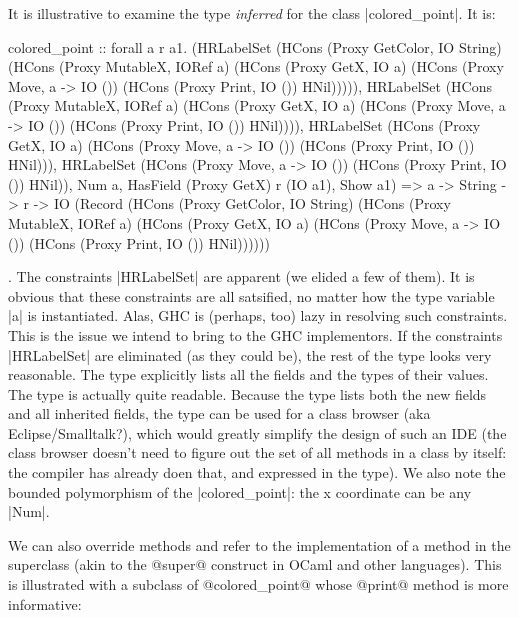 \noindent
It is illustrative to examine the type \emph{inferred} for the class 
|colored_point|. It is:
\begin{code}
colored_point :: forall a r a1.
		 (HRLabelSet (HCons
				  (Proxy GetColor, IO String)
				  (HCons
				       (Proxy MutableX, IORef a)
				       (HCons
					    (Proxy GetX, IO a)
					    (HCons
						 (Proxy Move, a -> IO ())
						 (HCons (Proxy Print, IO ()) HNil))))),
		  HRLabelSet (HCons
				  (Proxy MutableX, IORef a)
				  (HCons
				       (Proxy GetX, IO a)
				       (HCons
					    (Proxy Move, a -> IO ())
					    (HCons (Proxy Print, IO ()) HNil)))),
		  HRLabelSet (HCons
				  (Proxy GetX, IO a)
				  (HCons
				       (Proxy Move, a -> IO ()) (HCons (Proxy Print, IO ()) HNil))),
		  HRLabelSet (HCons
				  (Proxy Move, a -> IO ()) (HCons (Proxy Print, IO ()) HNil)),
		  Num a,
		  HasField (Proxy GetX) r (IO a1),
		  Show a1) =>
		 a
		 -> String
		    -> r
		       -> IO  (Record
				   (HCons
					(Proxy GetColor, IO String)
					(HCons
					     (Proxy MutableX, IORef a)
					     (HCons
						  (Proxy GetX, IO a)
						  (HCons
						       (Proxy Move, a -> IO ())
						       (HCons (Proxy Print, IO ()) HNil))))))


\end{code}
.
The constraints |HRLabelSet| are apparent (we elided a few of
them). It is obvious that these constraints are all satsified, no
matter how the type variable |a| is instantiated. Alas, GHC is
(perhaps, too) lazy in resolving such constraints. This is the issue
we intend to bring to the GHC implementors. If the constraints
|HRLabelSet| are eliminated (as they could be), the rest of the type
looks very reasonable. The type explicitly lists all the fields and
the types of their values. The type is actually quite
readable. Because the type lists both the new fields and all inherited
fields, the type can be used for a class browser (aka
Eclipse/Smalltalk?), which would greatly simplify the design of such
an IDE (the class browser doesn't need to figure out the set of all
methods in a class by itself: the compiler has already doen that, and
expressed in the type). We also note the bounded polymorphism of the
|colored_point|: the x coordinate can be any |Num|. 


We can also override methods and refer to the implementation of a
method in the superclass (akin to the @super@ construct in OCaml and
other languages). This is illustrated with a subclass of
@colored_point@ whose @print@ method is more informative:

